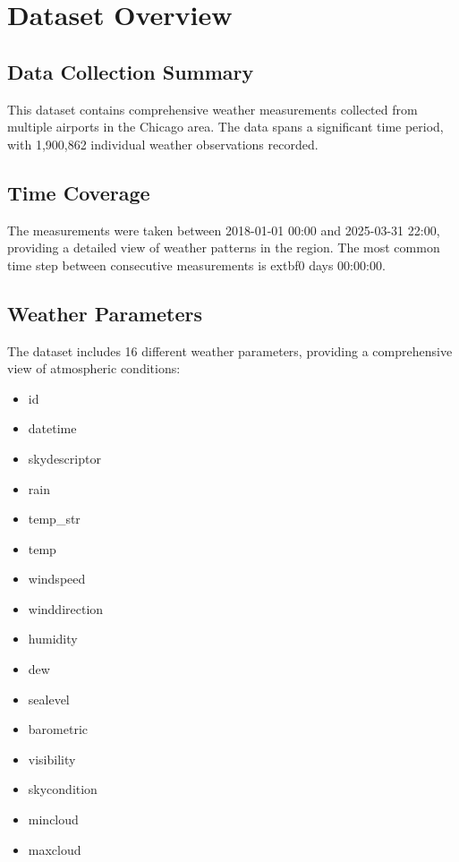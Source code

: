 \section{Dataset Overview}

\subsection{Data Collection Summary}
This dataset contains comprehensive weather measurements collected from multiple airports in the Chicago area. The data spans a significant time period, with 1,900,862 individual weather observations recorded.
\subsection{Time Coverage}
The measurements were taken between 2018-01-01 00:00 and 2025-03-31 22:00, providing a detailed view of weather patterns in the region. The most common time step between consecutive measurements is 	extbf{0 days 00:00:00}.
\subsection{Weather Parameters}
The dataset includes 16 different weather parameters, providing a comprehensive view of atmospheric conditions: \begin{itemize}
  \item id
  \item datetime
  \item skydescriptor
  \item rain
  \item temp_str
  \item temp
  \item windspeed
  \item winddirection
  \item humidity
  \item dew
  \item sealevel
  \item barometric
  \item visibility
  \item skycondition
  \item mincloud
  \item maxcloud
\end{itemize}

